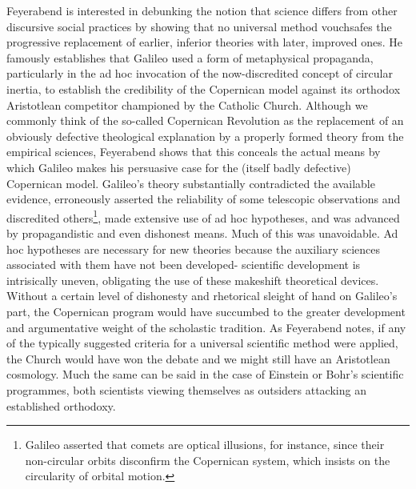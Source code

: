 Feyerabend is interested in debunking the notion that science differs from other discursive social practices by showing that no universal method vouchsafes the progressive replacement of earlier, inferior theories with later, improved ones. He famously establishes that Galileo used a form of metaphysical propaganda, particularly in the ad hoc invocation of the now-discredited concept of circular inertia, to establish the credibility of the Copernican model against its orthodox Aristotlean competitor championed by the Catholic Church. Although we commonly think of the so-called Copernican Revolution as the replacement of an obviously defective theological explanation by a properly formed theory from the empirical sciences, Feyerabend shows that this conceals the actual means by which Galileo makes his persuasive case for the (itself badly defective) Copernican model.  Galileo's theory substantially contradicted the available evidence, erroneously asserted the reliability of some telescopic observations and discredited others\footnote{Galileo asserted that comets are optical illusions, for instance, since their non-circular orbits disconfirm the Copernican system, which insists on the circularity of orbital motion.}, made extensive use of ad hoc hypotheses, and was advanced by propagandistic and even dishonest means. Much of this was unavoidable. Ad hoc hypotheses are necessary for new theories because the auxiliary sciences associated with them have not been developed- scientific development is intrisically uneven, obligating the use of these makeshift theoretical devices. Without a certain level of dishonesty and rhetorical sleight of hand on Galileo's part, the Copernican program would have succumbed to the greater development and argumentative weight of the scholastic tradition. As Feyerabend notes, if any of the typically suggested criteria for a universal scientific method were applied, the Church would have won the debate and we might still have an Aristotlean cosmology. Much the same can be said in the case of Einstein or Bohr's scientific programmes, both scientists viewing themselves as outsiders attacking an established orthodoxy.

